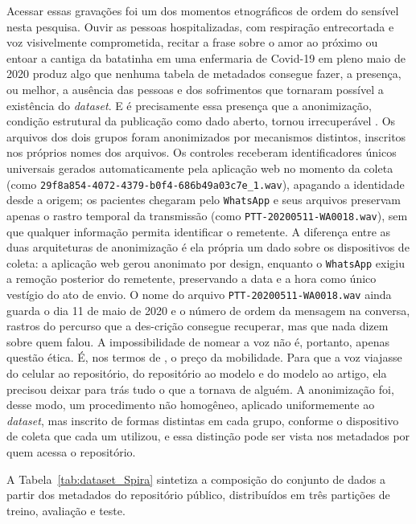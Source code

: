 Acessar essas gravações foi um dos momentos etnográficos de ordem do sensível nesta pesquisa. Ouvir as pessoas hospitalizadas, com respiração entrecortada e voz visivelmente comprometida, recitar a frase sobre o amor ao próximo ou entoar a cantiga da batatinha em uma enfermaria de Covid-19 em pleno maio de 2020 produz algo que nenhuma tabela de metadados consegue fazer, a presença, ou melhor, a ausência das pessoas e dos sofrimentos que tornaram possível a existência do \textit{dataset}. E é precisamente essa presença que a anonimização, condição estrutural da publicação como dado aberto, tornou irrecuperável \parencite{Casanova2021DeepLearning}. Os arquivos dos dois grupos foram anonimizados por mecanismos distintos, inscritos nos próprios nomes dos arquivos. Os controles receberam identificadores únicos universais gerados automaticamente pela aplicação web no momento da coleta (como \texttt{29f8a854-4072-4379-b0f4-686b49a03c7e\_1.wav}), apagando a identidade desde a origem; os pacientes chegaram pelo \texttt{WhatsApp} e seus arquivos preservam apenas o rastro temporal da transmissão (como \texttt{PTT-20200511-WA0018.wav}), sem que qualquer informação permita identificar o remetente. A diferença entre as duas arquiteturas de anonimização é ela própria um dado sobre os dispositivos de coleta: a aplicação web gerou anonimato por design, enquanto o \texttt{WhatsApp} exigiu a remoção posterior do remetente, preservando a data e a hora como único vestígio do ato de envio. O nome do arquivo \texttt{PTT-20200511-WA0018.wav} ainda guarda o dia 11 de maio de 2020 e o número de ordem da mensagem na conversa, rastros do percurso que a des-crição \parencite{Akrich1992Description} consegue recuperar, mas que nada dizem sobre quem falou. A impossibilidade de nomear a voz não é, portanto, apenas questão ética. É, nos termos de \textcite{Latour2017Esperanca}, o preço da mobilidade. Para que a voz viajasse do celular ao repositório, do repositório ao modelo e do modelo ao artigo, ela precisou deixar para trás tudo o que a tornava de alguém. A anonimização foi, desse modo, um procedimento não homogêneo, aplicado uniformemente ao \textit{dataset}, mas inscrito de formas distintas em cada grupo, conforme o dispositivo de coleta que cada um utilizou, e essa distinção pode ser vista nos metadados por quem acessa o repositório.

A Tabela~\ref{tab:dataset_Spira} sintetiza a composição do conjunto de dados a partir dos metadados do repositório público, distribuídos em três partições de treino, avaliação e teste.

